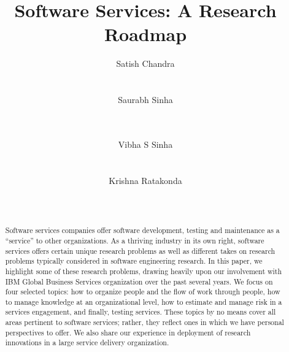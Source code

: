 \documentclass{sig-alternate}
\begin{document}
\title{Software Services: A Research Roadmap}


\author{
\alignauthor Satish Chandra\\
       \\
       \\
\alignauthor Saurabh Sinha\\
	\\
	\\
\and
\alignauthor Vibha S Sinha\\
	\\
	\\
\alignauthor Krishna Ratakonda\\
	\\
	\\
}

\maketitle

\begin{abstract}
Software services companies offer software development, testing and maintenance as a ``service'' to other organizations.  As a thriving industry in its own right, software services offers certain unique research problems as well as different takes on research problems typically considered in software engineering research. In this paper, we highlight some of these research problems, drawing heavily upon our involvement with IBM Global Business Services organization over the past several years.  We focus on four selected topics: how to organize people and the flow of work through people, how to manage knowledge at an organizational level, how to estimate and manage risk in a services engagement, and finally, testing services. These topics by no means cover all areas pertinent to software services; rather, they reflect ones in which we have personal perspectives to offer.  We also share our experience in deployment of  research innovations in a large service delivery organization.
\end{abstract}



\end{document}
